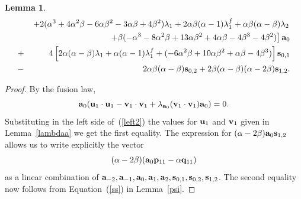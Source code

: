 \documentclass[a4paper]{amsart}
\newtheorem{lemma}{Lemma}[section]
\newcommand{\lmu}{\lambda_1}
\newcommand{\lmf}{\lambda_1^f}
\newcommand{\lmd}{\lambda_2}
\newcommand{\al}{\alpha}
\newcommand{\bt}{\beta}
\newcommand{\bv}{{\bf v}}
\newcommand{\ba}{{\bf a}}
\newcommand{\bu}{{\bf u}}
\newcommand{\bs}{{\bf s}}
\newcommand{\bp}{{\bf p}}
\newcommand{\bq}{{\bf q}}
\begin{document}
\begin{lemma}
\begin{eqnarray*}
& &\left . +2(\alpha^3+4 \alpha^2 \beta-6 \alpha \beta^2-3 \alpha \beta+4 \beta^2)\lmu+2\alpha\beta(\alpha -1) \lmf+\alpha\beta(\alpha- \beta)\lmd \right .\\
& &\left .+\beta(-\alpha^3 -8 \alpha^2 \beta+13 \alpha \beta^2+4 \alpha \beta-4 \beta^3-4 \beta^2)\right ] \ba_0\\
&+ &4\left [2   \alpha(\alpha-  \beta)   \lmu+\alpha( \alpha- 1)  \lmf+(-6   \alpha^2   \beta+10   \alpha   \beta^2+ \alpha   \beta-4   \beta^3)\right ]\bs_{0,1}\\
& -& 2\alpha\beta(\alpha -    \beta)\bs_{0,2}+2\beta( \alpha - \beta)(\alpha-2\beta) \bs_{1,2}.
\end{eqnarray*}

\end{lemma} 
\begin{proof}
 By the fusion law, 
 \begin{equation}
 \label{left2}
 \ba_0(\bu_1\cdot \bu_1 - \bv_1\cdot \bv_1 + \lambda_{\ba_0}(\bv_1\cdot \bv_1)\ba_0)=0.
 \end{equation} 
Substituting  in the left side of~(\ref{left2}) the values for $\bu_1$ and $\bv_1$ given in Lemma~\ref{lambdaa} we get the first equality. The expression for $(\al-2\bt)\ba_0\bs_{1,2}$ allows us to write explicitly  the vector  
$$
(\al-2\bt)(\ba_0\bp_{11}-\al \bq_{11})
$$ as a linear combination of $\ba_{-2}, \ba_{-1}, \ba_{0}, \ba_1, \ba_2, \bs_{0,1}, \bs_{0,2}, \bs_{1,2}$. The second equality now follows from  Equation~(\ref{ss}) in Lemma~\ref{psi}.
 \end{proof}
 
 
\end{document}
